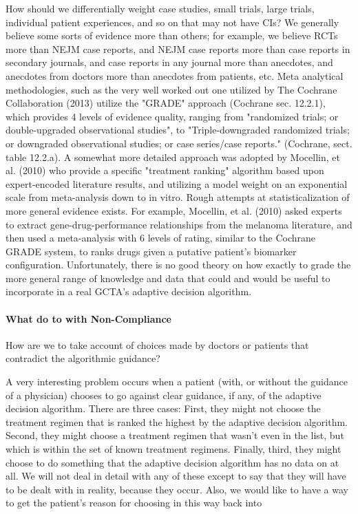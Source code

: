 \documentclass[12pt]{article}
\begin{document}
How should we differentially weight case studies, small trials,
large trials, individual patient experiences, and so on that may not
have CIs?  We generally believe some sorts of evidence more than
others; for example, we believe RCTs more than NEJM case reports, and
NEJM case reports more than case reports in secondary journals, and
case reports in any journal more than anecdotes, and anecdotes from
doctors more than anecdotes from patients, etc. Meta analytical
methodologies, such as the very well worked out one utilized by The
Cochrane Collaboration (2013) utilize the "GRADE" approach (Cochrane
sec. 12.2.1), which provides 4 levels of evidence quality, ranging
from "randomized trials; or double-upgraded observational studies", to
"Triple-downgraded randomized trials; or downgraded observational
studies; or case series/case reports." (Cochrane, sect. table 12.2.a).
A somewhat more detailed approach was adopted by Mocellin, et
al. (2010) who provide a specific "treatment ranking" algorithm based
upon expert-encoded literature results, and utilizing a model weight
on an exponential scale from meta-analysis down to in vitro. Rough
attempts at statisticalization of more general evidence exists. For
example, Mocellin, et al. (2010) asked experts to extract
gene-drug-performance relationships from the melanoma literature, and
then used a meta-analysis with 6 levels of rating, similar to the
Cochrane GRADE system, to ranks drugs given a putative patient’s
biomarker configuration. Unfortunately, there is no good theory on how
exactly to grade the more general range of knowledge and data that
could and would be useful to incorporate in a real GCTA’s adaptive decision algorithm.

\paragraph*{What do to with Non-Compliance}

How are we to take account of choices made by doctors or patients that contradict the
algorithmic guidance?

A very interesting problem occurs when a patient (with, or without the
guidance of a physician) chooses to go against clear guidance, if any,
of the adaptive decision algorithm. There are three cases: First, they
might not choose the treatment regimen that is ranked the highest by
the adaptive decision algorithm. Second, they might choose a treatment
regimen that wasn’t even in the list, but which is within the set of
known treatment regimens. Finally, third, they might choose to do
something that the adaptive decision algorithm has no data on at
all. We will not deal in detail with any of these except to say that
they will have to be dealt with in reality, because they occur.  Also,
we would like to have a way to get the patient’s reason for choosing
in this way back into
\end{document}
